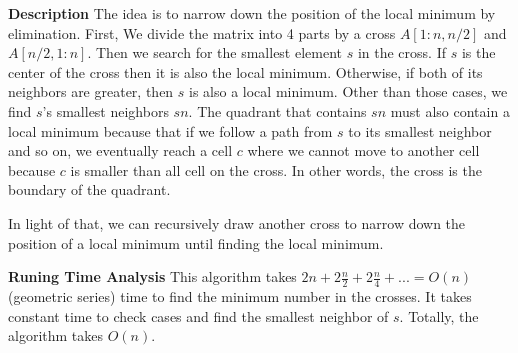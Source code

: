 \documentclass[12pt,article]{article}
\begin{document}
\textbf{Description}
The idea is to narrow down the position of the local minimum by elimination. First, We divide the matrix into 4 parts by a cross $A[1:n, n/2]$ and $A[n/2, 1:n]$. Then we search for the smallest element $s$ in the cross. If $s$ is the center of the cross then it is also the local minimum. Otherwise, if both of its neighbors are greater, then $s$ is also a local minimum. Other than those cases, we find $s$'s smallest neighbors $sn$. The quadrant that contains $sn$ must also contain a local minimum because that if we follow a path from $s$ to its smallest neighbor and so on, we eventually reach a cell $c$ where we cannot move to another cell because $c$ is smaller than all cell on the cross. In other words, the cross is the boundary of the quadrant.

In light of that, we can recursively draw another cross to narrow down the position of a local minimum until finding the local minimum.

\textbf{Runing Time Analysis}
This algorithm takes $2n + 2\frac{n}{2} + 2\frac{n}{4} + ... = O(n)$ (geometric series) time to find the minimum number in the crosses. It takes constant time to check cases and find the smallest neighbor of $s$. Totally, the algorithm takes $O(n)$.



\end{document}
